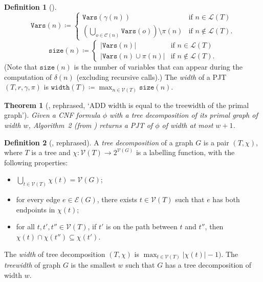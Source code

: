 \documentclass{article}
\newtheorem{theorem}{Theorem}
\theoremstyle{definition}
\newtheorem{definition}{Definition}
\theoremstyle{remark}
\begin{document}
\begin{definition}[\cite{DBLP:conf/cp/DudekPV20}] \label{def:size}
  \[
    \mathtt{Vars}(n) \coloneqq
    \begin{cases}
      \mathtt{Vars}(\gamma(n)) & \text{if } n \in \mathcal{L}(T) \\
      \left( \bigcup_{o \in \mathcal{C}(n)} \mathtt{Vars}(o) \right) \setminus
      \pi(n) & \text{if } n \not\in \mathcal{L}(T).
    \end{cases}
  \]
  \[
    \mathtt{size}(n) \coloneqq
    \begin{cases}
      |\mathtt{Vars}(n)| & \text{if } n \in \mathcal{L}(T) \\
      |\mathtt{Vars}(n) \cup \pi(n)| & \text{if } n \not\in \mathcal{L}(T).
    \end{cases}
  \]
  (Note that $\mathtt{size}(n)$ is the number of variables that can appear
  during the computation of $\delta(n)$ (excluding recursive calls).)
  The \emph{width} of a PJT $(T, r, \gamma, \pi)$ is
  $\mathtt{width}(T) \coloneqq \max_{n \in \mathcal{V}(T)} \mathtt{size}(n)$.
\end{definition} %

\begin{theorem}[\cite{DBLP:conf/cp/DudekPV20}, rephrased, `ADD width is equal
  to the treewidth of the primal graph']
  Given a CNF formula $\phi$ with a tree decomposition of its primal graph of
  width $w$, Algorithm~2 (from \cite{DBLP:conf/cp/DudekPV20}) returns a
  PJT of $\phi$ of width at most $w+1$.
\end{theorem}

\begin{definition}[\cite{DBLP:journals/jct/RobertsonS84}, rephrased]
  A \emph{tree decomposition} of a graph $G$ is a pair $(T, \chi)$, where $T$ is
  a tree and $\chi\colon \mathcal{V}(T) \to 2^{\mathcal{V}(G)}$ is a labelling
  function, with the following properties:
  \begin{itemize}
  \item $\bigcup_{t \in \mathcal{V}(T)} \chi(t) = \mathcal{V}(G)$;
  \item for every edge $e \in \mathcal{E}(G)$, there exists $t \in
    \mathcal{V}(T)$ such that $e$ has both endpoints in $\chi(t)$;
  \item for all $t, t', t'' \in \mathcal{V}(T)$, if $t'$ is on the path between
    $t$ and $t''$, then $\chi(t) \cap \chi(t'') \subseteq \chi(t')$.
  \end{itemize}
  The \emph{width} of tree decomposition $(T, \chi)$ is $\max_{t \in
    \mathcal{V}(T)} |\chi(t)| - 1)$. The \emph{treewidth} of graph $G$ is the
  smallest $w$ such that $G$ has a tree decomposition of width $w$.
\end{definition}
\end{document}
